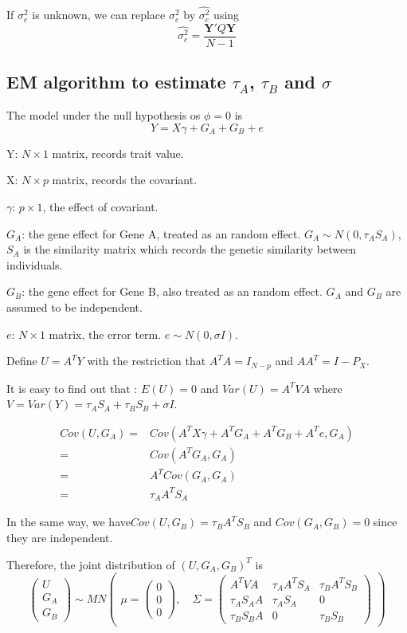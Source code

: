 \documentclass{article}
\newcommand{\Y}{\mathbf{Y}}
\begin{document}
            If $\sigma^2_e$ is unknown, we can replace $\sigma^2_e$ by $\hat{\sigma^2_e}$ using
            \[
                \hat{\sigma^2_e}=\frac{\Y'Q\Y}{N-1}
            \]

        \subsection{EM algorithm to estimate $\tau_A$, $\tau_B$ and $\sigma$}
            The model under the null hypothesis os $\phi=0$ is
            \[
                Y=X\gamma+G_A+G_B+e
            \]

            Y: $N\times1$ matrix, records trait value.

            X: $N\times p$ matrix, records the covariant.

            $\gamma$: $p\times 1$, the effect of covariant.

            $G_A$: the gene effect for Gene A, treated as an random effect. $G_A\sim N(0, \tau_AS_A)$, $S_A$ is the similarity matrix which records the genetic similarity between individuals.

            $G_B$: the gene effect for Gene B, also treated as an random effect. $G_A$ and  $G_B$ are assumed to be independent.

            $e$: $N\times1$ matrix,  the error term. $e\sim N (0, \sigma I)$.

            Define $U=A^TY$ with the restriction that $A^TA=I_{N-p}$ and $AA^T=I-P_X$.

            It is easy to find out that : $E(U)=0$ and $Var(U)=A^TVA$ where $V=Var(Y)=\tau_AS_A+\tau_BS_B+\sigma I$.

            \[ \begin{split}
                Cov(U,G_A)=& Cov(A^TX\gamma+A^TG_A+A^TG_B+A^Te,G_A)\\
                          =& Cov(A^TG_A,G_A)\\
                          =& A^TCov(G_A,G_A)\\
                          =&\tau_AA^TS_A
            \end{split}\]

            In the same way, we have$Cov(U,G_B)=\tau_BA^TS_B$ and $Cov(G_A,G_B)=0$ since they are independent.

            Therefore, the joint distribution of $(U,G_A,G_B)^T$ is
            \[
                \begin{pmatrix} U\\G_A\\G_B \end{pmatrix} \sim MN \begin{pmatrix} \mu=\begin{pmatrix} 0\\0\\0 \end{pmatrix},\quad \Sigma=\begin{pmatrix} A^TVA&\tau_AA^TS_A&\tau_BA^TS_B\\ \tau_AS_AA&\tau_AS_A&0\\\tau_BS_BA&0&\tau_BS_B \end{pmatrix} \end{pmatrix}
            \]
\end{document}
